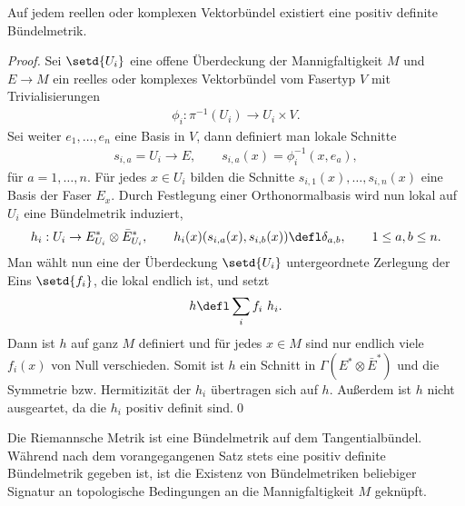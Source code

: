 \documentclass[%
	paper=a5,%
	fleqn,%
	DIV=18,%
	BCOR=0mm,
	fontsize=11pt,
	titlepage=false,%
	bibliography=totoc,
	DIV=18,%
	twoside=true,
	pdftitle=Riemannsche Geometrie,
	pdfauthor=Uwe Semmelmann,
	numbers=noendperiod]%
	{scrbook}
\begin{document}
\begin{prop}
Auf jedem reellen oder komplexen Vektorbündel existiert eine positiv definite
Bündelmetrik.\fish
\end{prop}
\begin{proof}
Sei $\setd{U_i}$ eine offene Überdeckung der Mannigfaltigkeit $M$ und
$E\to M$ ein reelles oder komplexes Vektorbündel vom Fasertyp $V$ mit
Trivialisierungen
\begin{align*}
\phi_i : \pi^{-1}(U_i) \to U_i\times V.
\end{align*}
Sei weiter $e_1,\ldots,e_n$ eine Basis in $V$, dann definiert man lokale
Schnitte
\begin{align*}
s_{i,a} = U_i\to E,\qquad s_{i,a}(x) = \phi_{i}^{-1}(x,e_a),
\end{align*}
für $a=1,\ldots,n$. Für jedes $x\in U_i$ bilden die Schnitte
$s_{i,1}(x),\ldots,s_{i,n}(x)$ eine Basis der Faser $E_x$. Durch Festlegung
einer Orthonormalbasis wird nun lokal auf $U_i$ eine Bündelmetrik induziert,
\begin{align*}
h_i : U_i\to E_{U_i}^*\otimes \bar{E}_{U_i}^*,\qquad
h_i(x)(s_{i,a}(x),s_{i,b}(x)) \defl \delta_{a,b},\qquad 1\le a,b\le n.
\end{align*}
Man wählt nun eine der Überdeckung $\setd{U_i}$ untergeordnete Zerlegung der
Eins $\setd{f_i}$, die lokal endlich ist, und setzt
\begin{align*}
h \defl \sum_{i} f_i\ h_i.
\end{align*}
Dann ist $h$ auf ganz $M$ definiert und für jedes $x\in M$ sind nur endlich
viele $f_i(x)$ von Null verschieden. Somit ist $h$ ein Schnitt in
$\Gamma(E^*\otimes \bar{E}^*)$ und die Symmetrie bzw. Hermitizität
der $h_i$ übertragen sich auf $h$. Außerdem ist $h$ nicht ausgeartet, da die
$h_i$ positiv definit sind.\qed
\end{proof}

\begin{ex}
Die Riemannsche Metrik ist eine Bündelmetrik auf dem Tangentialbündel. Während
nach dem vorangegangenen Satz stets eine positiv definite Bündelmetrik
gegeben ist, ist die Existenz von Bündelmetriken beliebiger Signatur an
topologische Bedingungen an die Mannigfaltigkeit $M$ geknüpft.\boxc
\end{ex}
\end{document}
